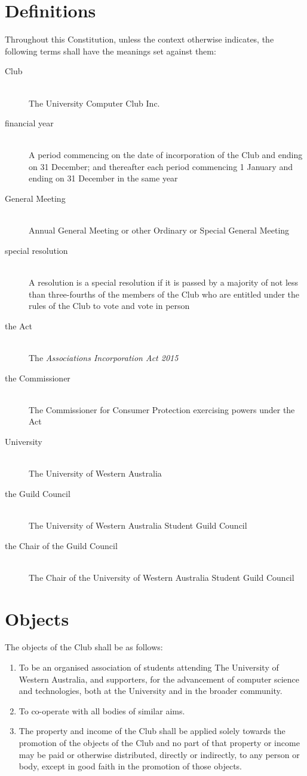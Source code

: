 \documentclass[11pt]{article} %
\begin{document}
\section{Definitions}
Throughout this Constitution, unless the context otherwise indicates, the following terms shall have the meanings set against them:
\begin{description}
	\item[Club] \hfill \\
		The University Computer Club Inc.
	\item[financial year] \hfill \\
		A period commencing on the date of incorporation of the Club and ending on 31 December; and thereafter each period commencing 1 January and ending on 31 December in the same year
	\item[General Meeting] \hfill \\
		Annual General Meeting or other Ordinary or Special General Meeting
	\item[special resolution] \hfill \\
		A resolution is a special resolution if it is passed by a majority of not less than three-fourths of the members of the Club who are entitled under the rules of the Club to vote and vote in person
	\item[the Act] \hfill \\
		The \emph{Associations Incorporation Act 2015}
	\item[the Commissioner] \hfill \\
		The Commissioner for Consumer Protection exercising powers under the Act
	\item[University] \hfill \\
		The University of Western Australia
	\item[the Guild Council] \hfill \\
	    The University of Western Australia Student Guild Council
	\item[the Chair of the Guild Council] \hfill \\
	    The Chair of the University of Western Australia Student Guild Council
\end{description}

\section{Objects}
The objects of the Club shall be as follows:
\begin{enumerate}
	\item To be an organised association of students attending The University of Western Australia, and supporters, for the advancement of computer science and technologies, both at the University and in the broader community.
	\item To co-operate with all bodies of similar aims.
	\item The property and income of the Club shall be applied solely towards the promotion of the objects of the Club and no part of that property or income may be paid or otherwise distributed, directly or indirectly, to any person or body, except in good faith in the promotion of those objects.
\end{enumerate}
\end{document}
